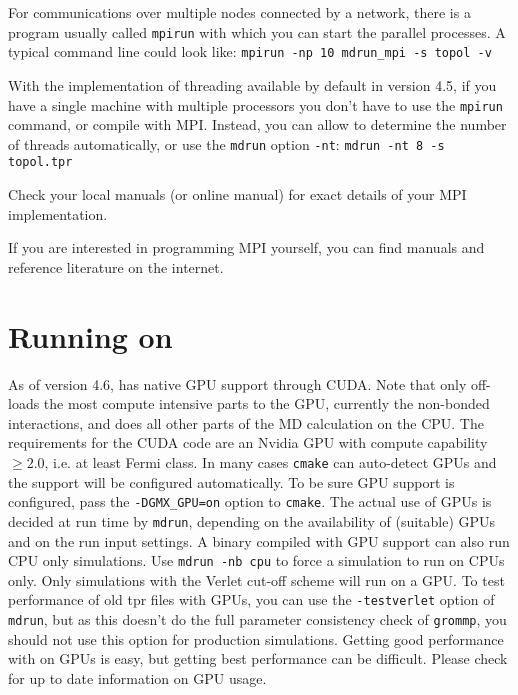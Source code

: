 For communications over multiple nodes connected by a network,
there is a program usually called {\tt mpirun} with which you can start 
the parallel processes. A typical command line could look like:
{\tt mpirun -np 10 mdrun_mpi -s topol -v}

With the implementation of threading available by default in {\gromacs} version 4.5, 
if you have a single machine with multiple processors you don't have to
use the {\tt mpirun} command, or compile with MPI. Instead, you can
allow {\gromacs} to determine the number of threads automatically, or use the {\tt mdrun} option {\tt -nt}:
{\tt mdrun -nt 8 -s topol.tpr}

Check your local manuals (or online manual) for exact details
of your MPI implementation.

If you are interested in programming MPI yourself, you can find
manuals and reference literature on the internet.


\section{Running {\gromacs} on }
As of version 4.6, {\gromacs} has native GPU support through CUDA.
Note that {\gromacs} only off-loads the most compute intensive parts
to the GPU, currently the non-bonded interactions, and does all other
parts of the MD calculation on the CPU. The requirements for the CUDA code
are an Nvidia GPU with compute capability $\geq 2.0$, i.e. at
least Fermi class.
In many cases {\tt cmake} can auto-detect GPUs and the support will be
configured automatically. To be sure GPU support is configured, pass
the {\tt -DGMX_GPU=on} option to {\tt cmake}. The actual use of GPUs
is decided at run time by {\tt mdrun}, depending on the availability
of (suitable) GPUs and on the run input settings. A binary compiled
with GPU support can also run CPU only simulations. Use {\tt mdrun -nb cpu}
to force a simulation to run on CPUs only. Only simulations with the Verlet
cut-off scheme will run on a GPU. To test performance of old tpr files
with GPUs, you can use the {\tt -testverlet} option of {\tt mdrun},
but as this doesn't do the full parameter consistency check of {\tt grommp},
you should not use this option for production simulations.
Getting good performance with {\gromacs} on GPUs is easy,
but getting best performance can be difficult.
Please check {\wwwpage} for up to date information on GPU usage.

